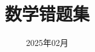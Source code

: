 \documentclass[a4paper]{ctexart}
\title{\heiti\zihao{2} 数学错题集}
\date{2025年02月}
\begin{document}
    \maketitle
    \thispagestyle{empty}

    \newpage

    \setcounter{page}{1}
    \cfoot{\thepage}

    \renewcommand{\footrulewidth}{1pt}
    \tableofcontents

    \newpage


    \setcounter{page}{1}


    \begin{sloppy}
        \begin{enumerate}
            
            
        \end{enumerate}
    \end{sloppy}
\end{document}
